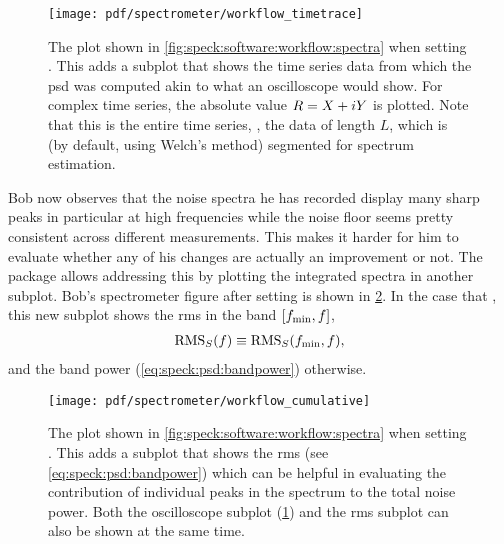 \begin{figure}
    \centering
    \texttt{[image: pdf/spectrometer/workflow\_timetrace]}
    \caption{
        The \pyspeck plot shown in \cref{fig:speck:software:workflow:spectra} when setting .
        This adds a subplot that shows the time series data from which the \gls{psd} was computed akin to what an oscilloscope would show.
        For complex time series, the absolute value $R = X + i Y$ is plotted.
        Note that this is the entire time series, \ie, the data of length $L$, which is (by default, using Welch's method) segmented for spectrum estimation.
    }
    \label{fig:speck:software:workflow:timetrace}
\end{figure}

Bob now observes that the noise spectra he has recorded display many sharp peaks in particular at high frequencies while the \oneoverf noise floor seems pretty consistent across different measurements.
This makes it harder for him to evaluate whether any of his changes are actually an improvement or not.
The \pyspeck package allows addressing this by plotting the integrated spectra in another subplot.
Bob's spectrometer figure after setting  is shown in \cref{fig:speck:software:workflow:cumulative}.
In the case that , this new subplot shows the \gls{rms} in the band $[f_{\mathrm{min}}, f]$,
\begin{align}\label{eq:speck:software:cumulative}
    \operatorname{RMS}_S(f)\equiv\operatorname{RMS}_S(f_{\mathrm{min}}, f),
\end{align}
and the band power (\cref{eq:speck:psd:bandpower}) otherwise.

\begin{figure}
    \centering
    \texttt{[image: pdf/spectrometer/workflow\_cumulative]}
    \caption{
        The \pyspeck plot shown in \cref{fig:speck:software:workflow:spectra} when setting .
        This adds a subplot that shows the \gls{rms} (see \cref{eq:speck:psd:bandpower}) which can be helpful in evaluating the contribution of individual peaks in the spectrum to the total noise power.
        Both the oscilloscope subplot (\cref{fig:speck:software:workflow:timetrace}) and the \gls{rms} subplot can also be shown at the same time.
    }
    \label{fig:speck:software:workflow:cumulative}
\end{figure}

